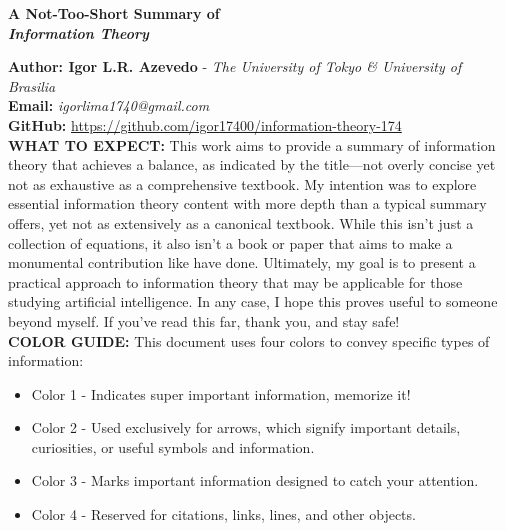 \documentclass[a4paper,10pt]{article}
\begin{document}
\noindent 
\begin{center}
\textbf{{\LARGE A Not-Too-Short Summary of \\ \textit{Information Theory}}} 
\end{center}
\vspace{1cm}

\noindent 
\textbf{Author: Igor L.R. Azevedo} - \textit{The University of Tokyo \& University of Brasilia}
\\
\textbf{Email:} \textit{igorlima1740@gmail.com}
\\
\textbf{GitHub:} \url{https://github.com/igor17400/information-theory-174}
\\


\noindent 
\textbf{WHAT TO EXPECT: } This work aims to provide a summary of information theory that achieves a balance, as indicated by the title—not overly concise yet not as exhaustive as a comprehensive textbook. My intention was to explore essential information theory content with more depth than a typical summary offers, yet not as extensively as a canonical textbook. While this isn't just a collection of equations, it also isn't a book or paper that aims to make a monumental contribution like \cite{mackay_book, willey_info_theory} have done. Ultimately, my goal is to present a practical approach to information theory that may be applicable for those studying artificial intelligence. In any case, I hope this proves useful to someone beyond myself. If you've read this far, thank you, and stay safe!
\\

\noindent
\textbf{COLOR GUIDE:} This document uses four colors to convey specific types of information:
\begin{itemize}
    \item \colorbox{color1}{Color 1} - Indicates super important information, memorize it!
    \item \colorbox{color2}{Color 2} - Used exclusively for arrows, which signify important details, curiosities, or useful symbols and information.
    \item \colorbox{color3}{Color 3} - Marks important information designed to catch your attention.
    \item \colorbox{color4}{Color 4} - Reserved for citations, links, lines, and other objects.
\end{itemize}
\end{document}
